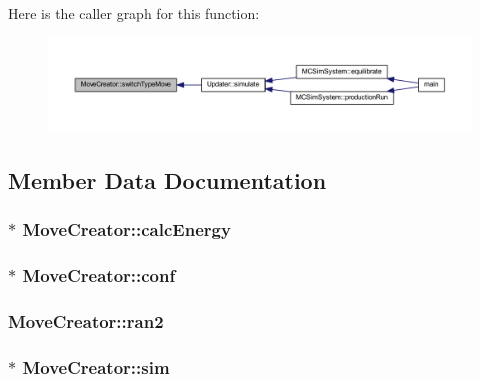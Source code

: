 Here is the caller graph for this function\+:\nopagebreak
\begin{figure}[H]
\begin{center}
\leavevmode
\includegraphics[width=350pt]{class_move_creator_a883ac539f14fff01eb0953866a6acc65_icgraph}
\end{center}
\end{figure}




\subsection{Member Data Documentation}
\hypertarget{class_move_creator_ac60e9b10f19291781e8e3b668044aef9}{
\subsubsection[{calc\+Energy}]{$\ast$ Move\+Creator\+::calc\+Energy}}\label{class_move_creator_ac60e9b10f19291781e8e3b668044aef9}
\hypertarget{class_move_creator_ab8854d02b8ca0b270709909e2ed1fb27}{
\subsubsection[{conf}]{$\ast$ Move\+Creator\+::conf\hspace{0.3cm}{\ttfamily [private]}}}\label{class_move_creator_ab8854d02b8ca0b270709909e2ed1fb27}
\hypertarget{class_move_creator_addcd872d90fcfd53bc0ffd83b1b5a770}{
\subsubsection[{ran2}]{ Move\+Creator\+::ran2}}\label{class_move_creator_addcd872d90fcfd53bc0ffd83b1b5a770}
\hypertarget{class_move_creator_a75cae5ea1a390a8f3dc20e8870576404}{
\subsubsection[{sim}]{$\ast$ Move\+Creator\+::sim\hspace{0.3cm}{\ttfamily [private]}}}\label{class_move_creator_a75cae5ea1a390a8f3dc20e8870576404}
